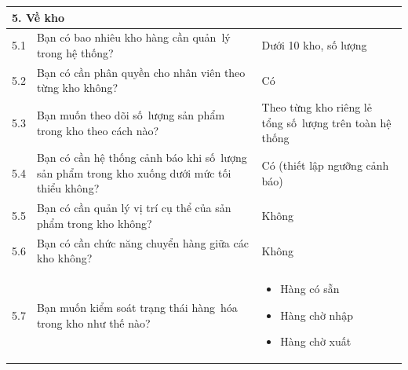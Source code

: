 \documentclass[a4paper,12pt]{report}
\begin{document}
\begin{longtable}{|c|p{8cm}|p{7cm}|}
    \hline
    \multicolumn{3}{|l|}{\textbf{5. Về kho}}                                                                                                                                                                                                                          \\
    \hline
    5.1          & Bạn có bao nhiêu kho hàng cần quản~lý trong hệ thống?                                                                   & Dưới 10 kho, số lượng                                                                                                    \\
    \hline
    5.2          & Bạn có cần phân quyền cho nhân viên theo từng kho không?                                                                & Có                                                                                                                       \\
    \hline
    5.3          & Bạn muốn theo dõi số~lượng sản phẩm trong kho theo cách nào?                                                            & Theo từng kho riêng lẻ tổng số~lượng trên toàn hệ thống                                                                  \\
    \hline
    5.4          & Bạn có cần hệ thống cảnh báo khi số~lượng sản phẩm trong kho xuống dưới mức tối thiểu không?                            & Có (thiết lập ngưỡng cảnh báo)                                                                                           \\
    \hline
    5.5          & Bạn có cần quản lý vị trí cụ thể của sản phẩm trong kho không?                                                          & Không                                                                                                                    \\
    \hline
    5.6          & Bạn có cần chức năng chuyển hàng giữa các kho không?                                                                    & Không                                                                                                                    \\
    \hline
    5.7          & Bạn muốn kiểm soát trạng thái hàng~hóa trong kho như thế nào?                                                           &
    \begin{itemize}
        \item Hàng có sẵn
        \item Hàng chờ nhập
        \item Hàng chờ xuất

\end{itemize}
\end{longtable}
\end{document}
